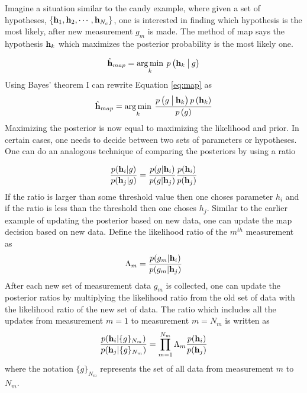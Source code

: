 Imagine a situation similar to the candy example, where given a set of hypotheses, $ \{ \mb{h}_1, \mb{h}_2, \cdots, \mb{h}_{N_c} \}$, one is interested in finding which hypothesis is the most likely, after new measurement $g_m$ is made. The method of \acrfull{map} says the hypothesis $ \mb{h}_k $ which maximizes the posterior probability is the most likely one. 

\begin{equation}
	\mbh{h}_{map} = \argminA_{k} \: p\left( \mb{h}_k \given[\big] g \right) 
	\label{eq:map}
\end{equation} 
Using Bayes' theorem I can rewrite Equation \ref{eq:map} as 
\begin{equation}
	\mbh{h}_{map} = \argminA_{k} \: \frac{ p\left( g  \given[\big] \mb{h}_k \right) p\left( \mb{h}_k \right) } { p\left(  g \right) }
\end{equation} 
Maximizing the posterior is now equal to maximizing the likelihood and prior. In certain cases, one needs to decide between two sets of parameters or hypotheses. One can do an analogous technique of comparing the posteriors by using a ratio

\begin{equation}
	\frac{ p( \mb{h}_i | g ) }{ p( \mb{h}_j | g ) } = \frac{ p(g|\mb{h}_i) }{ p(g|\mb{h}_j)} \frac{p(\mb{h}_i)}{p(\mb{h}_j)}
\end{equation}
If the ratio is larger than some threshold value then one choses parameter $h_i$ and if the ratio is less than the threshold then one choses $h_j$. Similar to the earlier example of updating the posterior based on new data, one can update the \gls{map} decision based on new data. Define the likelihood ratio of the $m^{th}$ measurement as 
\begin{equation}
	\Lambda_m = \frac{ p(g_m|\mb{h}_i) }{ p(g_m|\mb{h}_j)}
\end{equation}
After each new set of measurement data $g_{m}$ is collected, one can update the posterior ratios by multiplying the likelihood ratio from the old set of data with the likelihood ratio of the new set of data. The ratio which includes all the updates from measurement $m = 1$ to measurement $m = N_m$ is written as
\begin{equation}
	\frac{ p( \mb{h}_i| \{ g \} _{N_m} ) }{ p( \mb{h}_j | \{ g \} _{N_m} ) } = \displaystyle\prod_{m=1}^{N_m} \Lambda_m \frac{p(\mb{h}_i)}{p(\mb{h}_j)}
\end{equation}
where the notation $\{ g \} _{N_m}$ represents the set of all data from measurement $m$ to $N_m$.

